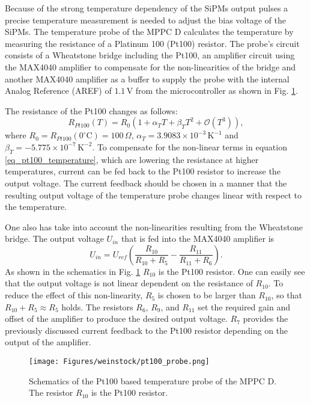 \documentclass[]{article}
\begin{document}
Because of the strong temperature dependency of the SiPMs output pulses a precise temperature measurement is needed to adjust the bias voltage of the SiPMs. The temperature probe of
the MPPC D calculates the temperature by measuring the resistance of a Platinum 100 (Pt100) resistor. The probe's circuit consists of a Wheatstone bridge including the Pt100, an amplifier circuit using
the MAX4040 amplifier to compensate for the non-linearities of the bridge and another MAX4040 amplifier as a buffer to supply the probe with the internal Analog Reference (AREF) of $1.1\,\text{V}$ from the microcontroller as shown in Fig. \ref{pt100_probe}.

The resistance of the Pt100 changes as follows:
	\begin{equation}
		R_{Pt100}(T) = R_0(1 +\alpha_T T + \beta_T T^2 + \mathcal{O}(T^3)),
		\label{eq_pt100_temperature}
	\end{equation}
where $R_0 = R_{Pt100}(0^{\circ} \text{C})=100\,\Omega$, $\alpha_T = 3.9083 \times 10^{-3}\, \text{K}^{-1}$ and $\beta_T = -5.775 \times 10^{-7}\, \text{K}^{-2}$. To compensate for 
the non-linear terms in equation \ref{eq_pt100_temperature}, which are lowering the resistance at higher temperatures, current can be fed back to the Pt100 resistor to increase 
the output voltage. The current feedback should be chosen in a manner that the resulting output voltage of the temperature probe changes linear with respect to the temperature.

One also has take into account the non-linearities resulting from the Wheatstone bridge. The output voltage $U_{in}$ that is fed into the MAX4040 amplifier is
	\begin{equation}
		U_{in} = U_{ref}(\frac{R_{10}}{R_{10} + R_5} - \frac{R_{11}}{R_{11} + R_6}).
	\end{equation}
As shown in the schematics in Fig. \ref{pt100_probe} $R_{10}$ is the Pt100 resistor. One can easily see that the output voltage is not linear dependent on the resistance
of $R_{10}$. To reduce the effect of this non-linearity, $R_{5}$ is chosen to be larger than $R_{10}$, so that $R_{10} + R_{5} \approx R_{5}$ holds. The resistors $R_6$, $R_9$, and 
$R_{11}$ set the required gain and offset of the amplifier to produce the desired output voltage. 
$R_7$ provides the previously discussed current feedback to the Pt100 resistor depending on the output of the amplifier.

	\begin{figure}[t]
		\centering
			\texttt{[image: Figures/weinstock/pt100\_probe.png]}
		\caption{Schematics of the Pt100 based temperature probe of the MPPC D. The resistor $R_{10}$ is the Pt100 resistor.}
		\label{pt100_probe}
	\end{figure}	
 
\end{document}
